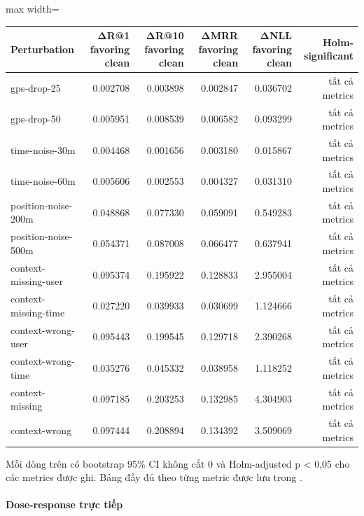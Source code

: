 \begin{table}[!htbp]
\centering
\scriptsize
\setlength{\tabcolsep}{2.5pt}
\begin{adjustbox}{max width=\textwidth}
\begin{tabular}{@{}lrrrrr@{}}
\toprule
Perturbation & ΔR@1 favoring clean & ΔR@10 favoring clean & ΔMRR favoring clean & ΔNLL favoring clean & Holm-significant \\
\midrule
gps-drop-25 & 0.002708 & 0.003898 & 0.002847 & 0.036702 & tất cả metrics \\
gps-drop-50 & 0.005951 & 0.008539 & 0.006582 & 0.093299 & tất cả metrics \\
time-noise-30m & 0.004468 & 0.001656 & 0.003180 & 0.015867 & tất cả metrics \\
time-noise-60m & 0.005606 & 0.002553 & 0.004327 & 0.031310 & tất cả metrics \\
position-noise-200m & 0.048868 & 0.077330 & 0.059091 & 0.549283 & tất cả metrics \\
position-noise-500m & 0.054371 & 0.087008 & 0.066477 & 0.637941 & tất cả metrics \\
context-missing-user & 0.095374 & 0.195922 & 0.128833 & 2.955004 & tất cả metrics \\
context-missing-time & 0.027220 & 0.039933 & 0.030699 & 1.124666 & tất cả metrics \\
context-wrong-user & 0.095443 & 0.199545 & 0.129718 & 2.390268 & tất cả metrics \\
context-wrong-time & 0.035276 & 0.045332 & 0.038958 & 1.118252 & tất cả metrics \\
context-missing & 0.097185 & 0.203253 & 0.132985 & 4.304903 & tất cả metrics \\
context-wrong & 0.097444 & 0.208894 & 0.134392 & 3.509069 & tất cả metrics \\
\bottomrule
\end{tabular}
\end{adjustbox}
\end{table}

Mỗi dòng trên có bootstrap 95\% CI không cắt 0 và Holm-adjusted p < 0,05 cho các metrics được ghi. Bảng đầy đủ theo từng metric được lưu trong .

\paragraph{Dose-response trực tiếp}

